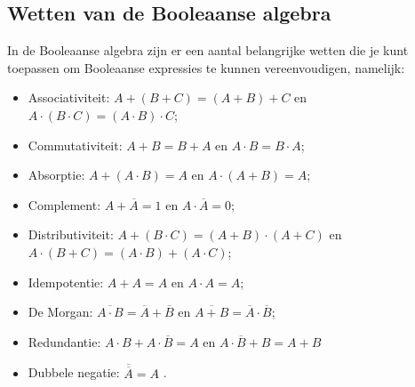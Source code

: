 \documentclass[12pt]{article}
\begin{document}
\subsection{Wetten van de Booleaanse algebra}
In de Booleaanse algebra zijn er een aantal belangrijke wetten die je kunt toepassen om Booleaanse expressies te kunnen vereenvoudigen, namelijk:
\begin{itemize}
    \item Associativiteit: $A+(B+C) = (A+B)+C$ en $A\cdot(B\cdot C) = (A\cdot B)\cdot C$; 
    \item Commutativiteit: $A+B = B+A$ en $A\cdot B = B\cdot A$;
    \item Absorptie: $A+(A\cdot B) = A$ en $A \cdot (A+B) = A$;
    \item Complement: $A + \overline{A} = 1$ en $A \cdot \overline{A} = 0$;
    \item Distributiviteit: $A+(B\cdot C) = (A+B)\cdot (A+C)$ en $A \cdot (B+C) = (A\cdot B)+(A\cdot C)$;
    \item Idempotentie: $A + A = A$ en $A \cdot A  = A$;
    \item De Morgan: $\overline{A \cdot B} = \overline{A}+\overline{B}$ en $\overline{A + B} = \overline{A} \cdot \overline{B}$;
    \item Redundantie: $A\cdot B + A\cdot \overline{B} = A$ en $A\cdot \overline{B} + B = A + B$
    \item Dubbele negatie: $\overline{\overline{A}} = A$ \cite{weyt}.
\end{itemize}
\pagebreak
\end{document}
